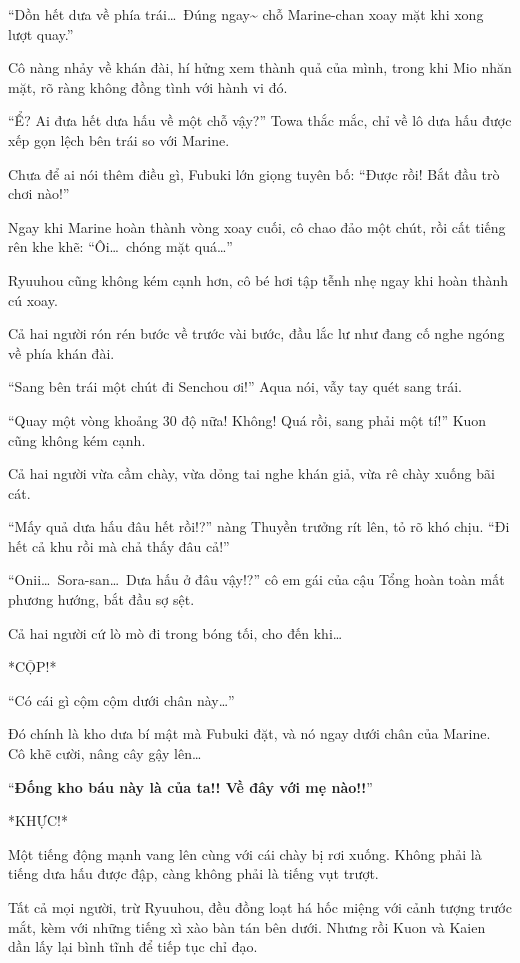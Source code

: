 \documentclass[../main.tex]{subfiles}
\begin{document}
``Dồn hết dưa về phía trái\dots\ Đúng ngay\~{} chỗ Marine-chan xoay mặt khi xong lượt quay.''

Cô nàng nhảy về khán đài, hí hửng xem thành quả của mình, trong khi Mio nhăn mặt, rõ ràng không đồng tình với hành vi đó.

``Ể? Ai đưa hết dưa hấu về một chỗ vậy?'' Towa thắc mắc, chỉ về lô dưa hấu được xếp gọn lệch bên trái so với Marine.

Chưa để ai nói thêm điều gì, Fubuki lớn giọng tuyên bố: ``Được rồi! Bắt đầu trò chơi nào!''

Ngay khi Marine hoàn thành vòng xoay cuối, cô chao đảo một chút, rồi cất tiếng rên khe khẽ: ``Ôi\dots\ chóng mặt quá\dots''

Ryuuhou cũng không kém cạnh hơn, cô bé hơi tập tễnh nhẹ ngay khi hoàn thành cú xoay.

Cả hai người rón rén bước về trước vài bước, đầu lắc lư như đang cố nghe ngóng về phía khán đài.

``Sang bên trái một chút đi Senchou ơi!'' Aqua nói, vẫy tay quét sang trái.

``Quay một vòng khoảng 30 độ nữa! Không! Quá rồi, sang phải một tí!'' Kuon cũng không kém cạnh.

Cả hai người vừa cầm chày, vừa dỏng tai nghe khán giả, vừa rê chày xuống bãi cát.

``Mấy quả dưa hấu đâu hết rồi!?'' nàng Thuyền trưởng rít lên, tỏ rõ khó chịu. ``Đi hết cả khu rồi mà chả thấy đâu cả!''

``Onii\dots\ Sora-san\dots\ Dưa hấu ở đâu vậy!?'' cô em gái của cậu Tổng hoàn toàn mất phương hướng, bắt đầu sợ sệt.

Cả hai người cứ lò mò đi trong bóng tối, cho đến khi\dots

*CỘP!*

``Có cái gì cộm cộm dưới chân này\dots''

Đó chính là kho dưa bí mật mà Fubuki đặt, và nó ngay dưới chân của Marine. Cô khẽ cười, nâng cây gậy lên\dots

``\textbf{Đống kho báu này là của ta!! Về đây với mẹ nào!!}''

*KHỰC!*

Một tiếng động mạnh vang lên cùng với cái chày bị rơi xuống. Không phải là tiếng dưa hấu được đập, càng không phải là tiếng vụt trượt.

Tất cả mọi người, trừ Ryuuhou, đều đồng loạt há hốc miệng với cảnh tượng trước mắt, kèm với những tiếng xì xào bàn tán bên dưới. Nhưng rồi Kuon và Kaien dần lấy lại bình tĩnh để tiếp tục chỉ đạo.
\end{document}
